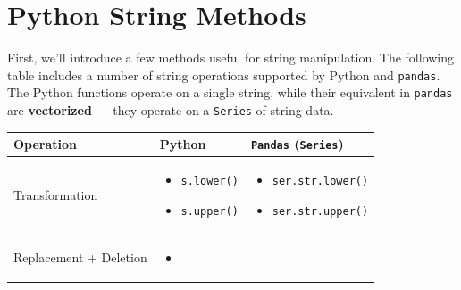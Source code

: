 \documentclass[
  letterpaper,
  DIV=11,
  numbers=noendperiod]{scrreprt}
\providecommand{\tightlist}{%
  \setlength{\itemsep}{0pt}\setlength{\parskip}{0pt}}\usepackage{longtable,booktabs,array}
\begin{document}
\section{Python String Methods}\label{python-string-methods}

First, we'll introduce a few methods useful for string manipulation. The
following table includes a number of string operations supported by
Python and \texttt{pandas}. The Python functions operate on a single
string, while their equivalent in \texttt{pandas} are
\textbf{vectorized} --- they operate on a \texttt{Series} of string
data.

\begin{longtable}[]{@{}
  >{\raggedright\arraybackslash}p{}
  >{\raggedright\arraybackslash}p{}
  >{\raggedright\arraybackslash}p{}@{}}
\toprule\noalign{}
\begin{minipage}[b]{\linewidth}\raggedright
Operation
\end{minipage} & \begin{minipage}[b]{\linewidth}\raggedright
Python
\end{minipage} & \begin{minipage}[b]{\linewidth}\raggedright
\texttt{Pandas} (\texttt{Series})
\end{minipage} \\
\midrule\noalign{}
\endhead
\bottomrule\noalign{}
\endlastfoot
Transformation & \begin{minipage}[t]{\linewidth}\raggedright
\begin{itemize}
\tightlist
\item
  \texttt{s.lower()}
\item
  \texttt{s.upper()}
\end{itemize}
\end{minipage} & \begin{minipage}[t]{\linewidth}\raggedright
\begin{itemize}
\tightlist
\item
  \texttt{ser.str.lower()}
\item
  \texttt{ser.str.upper()}
\end{itemize}
\end{minipage} \\
Replacement + Deletion & \begin{minipage}[t]{\linewidth}\raggedright
\begin{itemize}
\tightlist
\item

\end{itemize}
\end{minipage}
\end{longtable}
\end{document}
